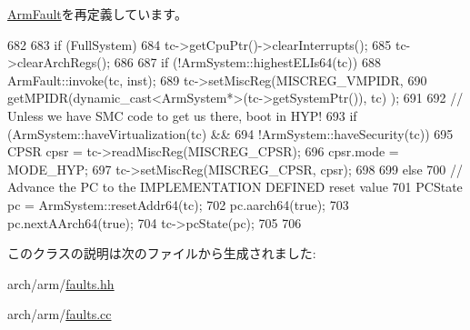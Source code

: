\hyperlink{classArmISA_1_1ArmFault_a2bd783b42262278d41157d428e1f8d6f}{ArmFault}を再定義しています。


\begin{DoxyCode}
682 {
683     if (FullSystem) {
684         tc->getCpuPtr()->clearInterrupts();
685         tc->clearArchRegs();
686     }
687     if (!ArmSystem::highestELIs64(tc)) {
688         ArmFault::invoke(tc, inst);
689         tc->setMiscReg(MISCREG_VMPIDR,
690                        getMPIDR(dynamic_cast<ArmSystem*>(tc->getSystemPtr()), tc)
      );
691 
692         // Unless we have SMC code to get us there, boot in HYP!
693         if (ArmSystem::haveVirtualization(tc) &&
694             !ArmSystem::haveSecurity(tc)) {
695             CPSR cpsr = tc->readMiscReg(MISCREG_CPSR);
696             cpsr.mode = MODE_HYP;
697             tc->setMiscReg(MISCREG_CPSR, cpsr);
698         }
699     } else {
700         // Advance the PC to the IMPLEMENTATION DEFINED reset value
701         PCState pc = ArmSystem::resetAddr64(tc);
702         pc.aarch64(true);
703         pc.nextAArch64(true);
704         tc->pcState(pc);
705     }
706 }
\end{DoxyCode}


このクラスの説明は次のファイルから生成されました:\begin{DoxyCompactItemize}
\item 
arch/arm/\hyperlink{arch_2arm_2faults_8hh}{faults.hh}\item 
arch/arm/\hyperlink{arch_2arm_2faults_8cc}{faults.cc}\end{DoxyCompactItemize}
